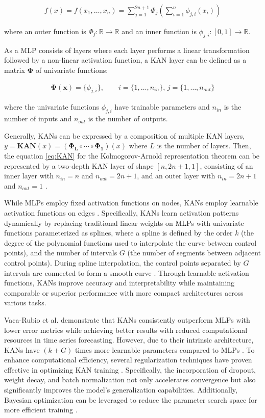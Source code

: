 \begin{align}
f(x) = f(x_{1}, \dots , x_{n}) = \sum_{j=1}^{2n+1} \Phi_j \left( \sum_{i=1}^{n} \phi_{j,i} (x_i) \right) \label{eq:KAN}
\end{align}

where an outer function is $\Phi_j: \mathbb{R} \rightarrow \mathbb{R}$ and an inner function is $\phi_{j,i}: [0,1] \rightarrow \mathbb{R}$. 

As a MLP consists of layers where each layer performs a linear transformation followed by a non-linear activation function, a KAN layer can be defined as a matrix $\mathbf{\Phi}$ of univariate functions:

\begin{align}
\mathbf{\Phi(x)} = \{ \phi_{j,i} \}, \qquad i = \{1, \dots, n_{in}\}, \, j = \{1, \dots, n_{out}\} \label{eq:KAN_layer}
\end{align}

where the univariate functions $\phi_{j,i}$ have trainable parameters and $n_{in}$ is the number of inputs and $n_{out}$ is the number of outputs.

Generally, KANs can be expressed by a composition of multiple KAN layers, $y = \textbf{KAN}(x) = (\mathbf{\Phi_{L}} \circ \cdots \circ \mathbf{\Phi_{1}})(x)$ where $L$ is the number of layers. Then, the equation \ref{eq:KAN} for the Kolmogorov-Arnold representation theorem can be represented by a two-depth KAN layer of shape $[n, 2n + 1, 1]$, consisting of an inner layer with $n_{in} = n$ and $n_{out} = 2n + 1$, and an outer layer with $n_{in} = 2n + 1$ and $n_{out} = 1$ \cite{liu2024kan}.

While MLPs employ fixed activation functions on nodes, KANs employ learnable activation functions on edges \cite{liu2024kan}. Specifically, KANs learn activation patterns dynamically by replacing traditional linear weights on MLPs with univariate functions parameterized as splines, where a spline is defined by the order $k$ (the degree of the polynomial functions used to interpolate the curve between control points), and the number of intervals $G$ (the number of segments between adjacent control points). During spline interpolation, the control points separated by $G$ intervals are connected to form a smooth curve \cite{vaca2024kolmogorov}. Through learnable activation functions, KANs improve accuracy and interpretability while maintaining comparable or superior performance with more compact architectures across various tasks.

Vaca-Rubio et al. \cite{vaca2024kolmogorov} demonstrate that KANs consistently outperform MLPs with lower error metrics while achieving better results with reduced computational resources in time series forecasting. However, due to their intrinsic architecture, KANs have $(k + G)$ times more learnable parameters compared to MLPs \cite{yu2024kan}. To enhance computational efficiency, several regularization techniques have proven effective in optimizing KAN training \cite{cheon2024improving}. Specifically, the incorporation of dropout, weight decay, and batch normalization not only accelerates convergence but also significantly improves the model's generalization capabilities. Additionally, Bayesian optimization can be leveraged to reduce the parameter search space for more efficient training \cite{snoek2012practical}.